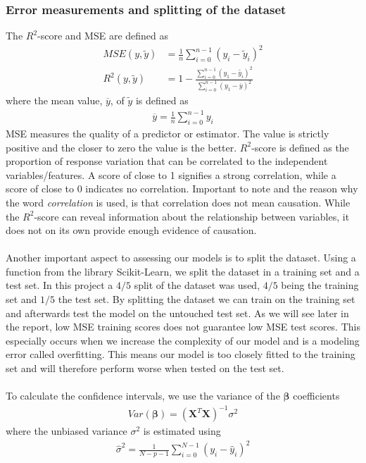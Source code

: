 \documentclass[a4paper,twocolumn]{article}
\newcommand{\X}{\mathbf{X}}
\newcommand{\B}{\boldsymbol{\beta}}
\begin{document}
\subsubsection{Error measurements and splitting of the dataset}
The $R^{2}$-score and MSE are defined as
\begin{align}
        MSE(y, \widetilde{y}) &= \frac{1}{n}\sum_{i=0}^{n-1}(y_{i} - \widetilde{y}_{i})^{2}\\
        R^{2}(y,\widetilde{y}) &= 1 - \frac{\sum_{i=0}^{n-1}(y_{1} - \widetilde{y_{i}})^{2}}{\sum_{i=0}^{n-1}(y_{1} - \overline{y})^{2}}
\end{align}
where the mean value, $\overline{y}$, of $\widetilde{y}$ is defined as
\begin{align}
    \overline{y} = \frac{1}{n}\sum_{i=0}^{n-1}y_{i}
\end{align}
MSE measures the quality of a predictor or estimator. The value is strictly positive and the closer to zero the value is the better. $R^{2}$-score is defined as the proportion of response variation that can be correlated to the independent variables/features. A score of close to 1 signifies a strong correlation, while a score of close to 0 indicates no correlation. Important to note and the reason why the word \textit{correlation} is used, is that correlation does not mean causation. While the $R^{2}$-score can reveal information about the relationship between variables, it does not on its own provide enough evidence of causation.\\
\\
Another important aspect to assessing our models is to split the dataset. Using a function from the library Scikit-Learn, we split the dataset in a training set and a test set. In this project a $4/5$ split of the dataset was used, $4/5$ being the training set and $1/5$ the test set. By splitting the dataset we can train on the training set and afterwards test the model on the untouched test set. As we will see later in the report, low MSE training scores does not guarantee low MSE test scores. This especially occurs when we increase the complexity of our model and is a modeling error called overfitting. This means our model is too closely fitted to the training set and will therefore perform worse when tested on the test set.\\
\\
To calculate the confidence intervals, we use the variance of the $\B$ coefficients\cite{ridge2} 
\begin{align*}
    Var(\B) = (\X^{T}\X)^{-1}\sigma^{2}
\end{align*}
where the unbiased variance $\sigma^{2}$ is estimated using
\begin{align*}
    \hat{\sigma}^{2} = \frac{1}{N-p-1}\sum_{i=0}^{N-1}(y_{i}-\hat{y}_{i})^{2}
\end{align*}
\end{document}
